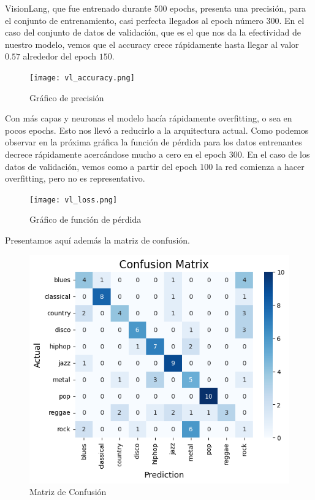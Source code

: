 \documentclass[colorinlistoftodos,twoside,twocolumn,10pt]{article} %
\begin{document}
VisionLang, que fue entrenado durante $500$ epochs, presenta una precisi\'on, para el conjunto de entrenamiento, casi perfecta llegados al epoch n\'umero $300$. En el caso del conjunto de  datos de validaci\'on, que es el que nos da la efectividad de nuestro modelo, vemos que el accuracy crece r\'apidamente hasta llegar al valor $0.57$ alrededor del epoch $150$. 

\begin{figure}[h!]
	\centering
	\texttt{[image: vl\_accuracy.png]}
	\caption{Gr\'afico de precisi\'on}
\end{figure}

Con m\'as capas y neuronas el modelo hac\'ia r\'apidamente overfitting, o sea en pocos epochs. Esto nos llev\'o a reducirlo a la arquitectura actual. Como podemos observar en la pr\'oxima gr\'afica la funci\'on de p\'erdida para los datos entrenantes decrece r\'apidamente acerc\'andose mucho a cero en el epoch $300$. En el caso de los datos de validaci\'on, vemos como a partir del epoch $100$ la red comienza a hacer overfitting, pero no es representativo. 

\begin{figure}[h!]
	\centering
	\texttt{[image: vl\_loss.png]}
	\caption{Gr\'afico de funci\'on de p\'erdida}
\end{figure}

Presentamos aqu\'i adem\'as la matriz de confusi\'on.

\begin{figure}[h!]
	
	\centering
	\includegraphics[width=0.9\linewidth]{vl_confussion_matrix.png}
	\caption{Matriz de Confusi\'on}
\end{figure}
\end{document}
